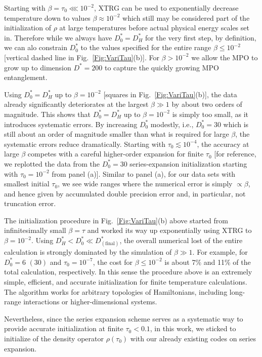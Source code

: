 \documentclass[aps,prx,twocolumn,showpacs,psfig,superscriptaddress,longbibliography]{revtex4-1}
\newcommand{\Fig}[1]{Fig.~\ref{#1}}
\def\Dstar{D^\ast}
\def\taui{\tau_0}
\def\Dstari{\Dstar_0}
\begin{document}
Starting with $\beta = \taui \lll 10^{-2}$, XTRG can be used to
exponentially decrease temperature down to values $\beta \approx
10^{-2}$ which still may be considered part of the initialization of
$\rho$ at large temperatures before actual physical energy scales
set in.  Therefore while we always have $\Dstari=\Dstar_H$ for the
very first step, by definition, we can alo constrain $\Dstari$ to
the values specified for the entire range $\beta \le 10^{-2}$
[vertical dashed line in \Fig{Fig:VariTau}(b)].  For $\beta >
10^{-2}$ we allow the MPO to grow up to dimension $\Dstar=200$ to
capture the quickly growing MPO entanglement.

Using $\Dstari = \Dstar_H$ up to $\beta = 10^{-2}$ [squares in
\Fig{Fig:VariTau}(b)], the data already significantly deteriorates
at the largest $\beta \gg 1$ by about two orders of magnitude. This
shows that $\Dstari = \Dstar_H$ up to $\beta=10^{-2}$ is simply too
small, as it introduces systematic errors.  By increasing $\Dstari$
modestly, i.e., $\Dstari=30$ which is still about an order of
magnitude smaller than what is required for large $\beta$, the
systematic errors reduce dramatically.  Starting with $\taui
\lesssim 10^{-4}$, the accuracy at large $\beta$ competes with a
careful higher-order expansion for finite $\taui$ [for reference, we
replotted the data from the $\Dstari=30$ series-expansion
initialization starting with $\taui=10^{-2}$ from panel (a)].
Similar to panel (a), for our data sets with smallest initial
$\taui$, we see wide ranges where the numerical error is simply
$\propto \beta$, and hence given by accumulated double precision
error and, in particular, not truncation error.

The initialization procedure in \Fig{Fig:VariTau}(b) above started
from infinitesimally small $\beta=\tau$ and worked its way up
exponentially using XTRG to $\beta=10^{-2}$.  Using $\Dstar_H <
\Dstari \ll \Dstar_\mathrm{(final)}$, the overall numerical lost of
the entire calculation is strongly dominated by the simulation of
$\beta \gg 1$.  For example, for $\Dstari = 6$ $(30)$ and
$\taui=10^{-7}$, the cost for $\beta \leq 10^{-2}$ is about 7\% and
11\% of the total calculation, respectively.  In this sense the
procedure above is an extremely simple, efficient, and accurate
initialization for finite temperature calculations. The algorithm
works for arbitrary topologies of Hamiltonians, including long-range
interactions or higher-dimensional systems.

Nevertheless, since the series expansion scheme serves as a
systematic way to provide accurate initialization at finite
$\taui<0.1$, in this work, we sticked to initialize of the density
operator $\rho(\taui)$ with our already existing codes on series
expansion.
\end{document}
